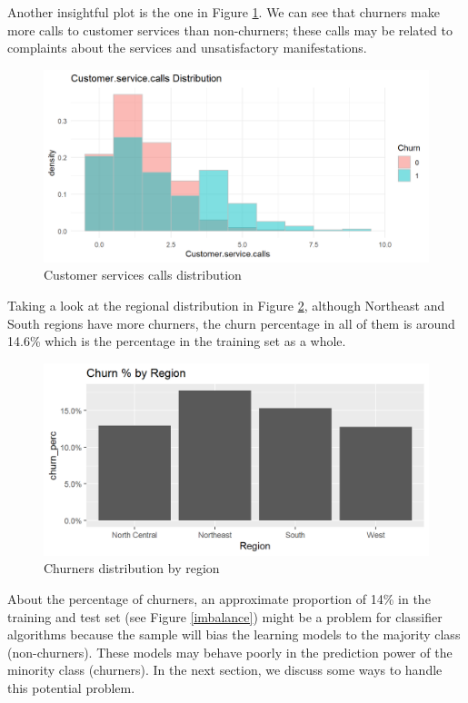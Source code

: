 \documentclass[12pt,letterpaper]{article}
\begin{document}
	Another insightful plot is the one in Figure \ref{cus_services}. We can see that churners make more calls to customer services than non-churners; these calls may be related to complaints about the services and unsatisfactory manifestations.
	
	\begin{figure}[!htb]
		\centering
		\includegraphics[scale=0.685]{images/customer_services.png}
		\caption{Customer services calls distribution}
		\label{cus_services}
	\end{figure}

Taking a look at the regional distribution in Figure \ref{region}, although Northeast and South regions have more churners, the churn percentage in all of them is around 14.6\% which is the percentage in the training set as a whole.
	\begin{figure}[!htb]
		\centering
		\includegraphics[scale=0.685]{images/region.png}
		\caption{Churners distribution by region}
		\label{region}
	\end{figure}

About the percentage of churners, an approximate proportion of 14\% in the training and test set (see Figure \ref{imbalance}) might be a problem for classifier algorithms because the sample will bias the learning models to the majority class (non-churners). These models may behave poorly in the prediction power of the minority class (churners). In the next section, we discuss some ways to handle this potential problem.
\end{document}
